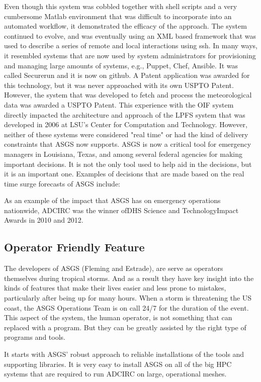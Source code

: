 \documentclass{article}
\begin{document}
Even though this system was cobbled together with shell scripts and a very
cumbersome Matlab environment that was difficult to incorporate into an
automated workflow, it demonstrated the efficacy of the approach. The system
continued to evolve, and was eventually using an XML based framework that was
used to describe a series of remote and local interactions using ssh. In many
ways, it resembled systems that are now used by system administrators for
provisioning and managing large amounts of systems, e.g., Puppet, Chef, Ansible.
It was called Securerun and it is now on github\cite{Securerun}. A Patent
application was awarded for this technology, but it was never approached with
its own USPTO Patent\cite{SecurerunUSPTO}. However, the system that was developed to fetch and
process the meteorological data was awarded a USPTO Patent.  This experience
with the OIF system directly impacted the architecture and approach of the LPFS
system that was developed in 2006 at LSU's Center for Computation and
Technology. However, neither of these systems were considered "real time" or had
the kind of delivery constraints that ASGS now supports.  ASGS is now a critical
tool for emergency managers in Louisiana, Texas, and among several federal
agencies for making important decisions. It is not the only tool used to help
aid in the decisions, but it is an important one.  Examples of decisions that
are made based on the real time surge forecasts of ASGS include:

As an example of the impact that ASGS has on emergency operations nationwide,
ADCIRC was the winner ofDHS Science and TechnologyImpact Awards in 2010 and
2012\cite{}.

\subsection{Operator Friendly Feature}

The developers of ASGS (Fleming and Estrade), are serve as operators themselves
during tropical storms. And as a result they have key insight into the kinds of
features that make their lives easier and less prone to mistakes, particularly
after being up for many hours. When a storm is threatening the US coast, the
ASGS Operations Team is on call 24/7 for the duration of the event. This aspect
of the system, the human operator, is not something that can replaced with a
program. But they can be greatly assisted by the right type of programs and
tools.

It starts with ASGS' robust approach to reliable installations of the tools and
supporting libraries. It is very easy to install ASGS on all of the big HPC
systems that are required to run ADCIRC on large, operational meshes.
\end{document}
